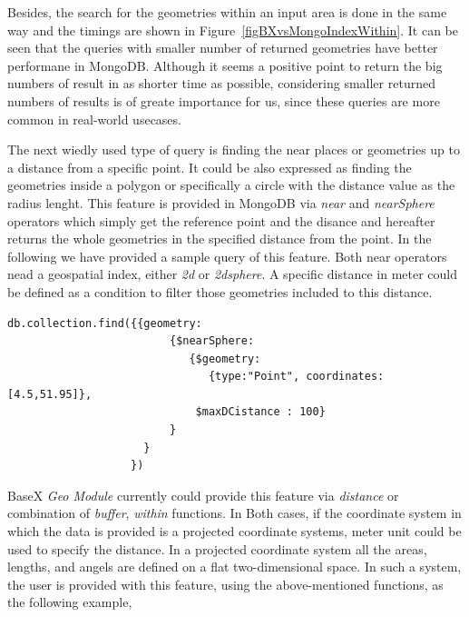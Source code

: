 \documentclass[a4paper,12pt]{article}
\begin{document}
Besides, the search for the geometries within an input area is done in the same way and the timings are shown in Figure~\ref{figBXvsMongoIndexWithin}. It can be seen that the queries with smaller number of returned geometries have better performane in MongoDB. Although it seems a positive point to return the big numbers of result in as shorter time as possible, considering smaller returned numbers of results is of greate importance for us, since these queries are more common in real-world usecases.


The next wiedly used type of query is finding the near places or geometries up to a distance from a specific point. It could be also expressed as finding the geometries inside a polygon or specifically a circle with the distance value as the radius lenght. This feature is provided in MongoDB via \textit{near} and \textit{nearSphere} operators which simply get the reference point and the disance and hereafter returns the whole geometries in the specified distance from the point. In the following we have provided a sample query of this feature. Both near operators nead a geospatial index, either \textit{2d} or \textit{2dsphere}. A specific distance in meter could be defined as a condition to filter those geometries included to this distance. 

\begin{verbatim}
db.collection.find({{geometry:
                         {$nearSphere:
                            {$geometry:
                               {type:"Point", coordinates:[4.5,51.95]}, 
                             $maxDCistance : 100}
                         }
                     }
                   })
\end{verbatim}

BaseX \textit{Geo Module} currently could provide this feature via \textit{distance} or combination of \textit{buffer}, \textit{within} functions. In Both cases, if the coordinate system in which the data is provided is a projected coordinate systems\cite{}, meter unit could be used to specify the distance. In a projected coordinate system all the areas, lengths, and angels are defined on a flat two-dimensional space. In such a system, the user is provided with this feature, using the above-mentioned functions, as the following example,
\end{document}
